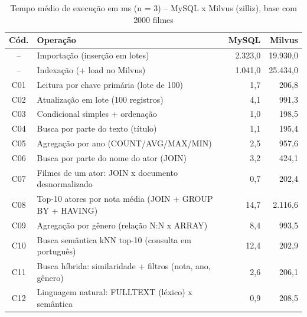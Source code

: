 \begin{table}[ht]
\centering
\caption{Tempo médio de execução em ms (n = 3) -- MySQL x Milvus (zilliz), base com 2000 filmes}
\label{tab:resultados}
\small
\begin{tabular}{|c|l|r|r|}
\hline
\textbf{Cód.} & \textbf{Operação} & \textbf{MySQL} & \textbf{Milvus} \\ \hline
-- & Importação (inserção em lotes) & 2.323,0 & 19.930,0 \\ \hline
-- & Indexação (+ load no Milvus) & 1.041,0 & 25.434,0 \\ \hline
C01 & Leitura por chave primária (lote de 100) & 1,7 & 206,8 \\ \hline
C02 & Atualização em lote (100 registros) & 4,1 & 991,3 \\ \hline
C03 & Condicional simples + ordenação & 1,0 & 198,5 \\ \hline
C04 & Busca por parte do texto (título) & 1,1 & 195,4 \\ \hline
C05 & Agregação por ano (COUNT/AVG/MAX/MIN) & 2,5 & 957,6 \\ \hline
C06 & Busca por parte do nome do ator (JOIN) & 3,2 & 424,1 \\ \hline
C07 & Filmes de um ator: JOIN x documento desnormalizado & 0,7 & 202,4 \\ \hline
C08 & Top-10 atores por nota média (JOIN + GROUP BY + HAVING) & 14,7 & 2.116,6 \\ \hline
C09 & Agregação por gênero (relação N:N x ARRAY) & 8,4 & 993,5 \\ \hline
C10 & Busca semântica kNN top-10 (consulta em português) & 12,4 & 202,9 \\ \hline
C11 & Busca híbrida: similaridade + filtros (nota, ano, gênero) & 2,6 & 206,1 \\ \hline
C12 & Linguagem natural: FULLTEXT (léxico) x semântica & 0,9 & 208,5 \\ \hline
\end{tabular}
\end{table}
